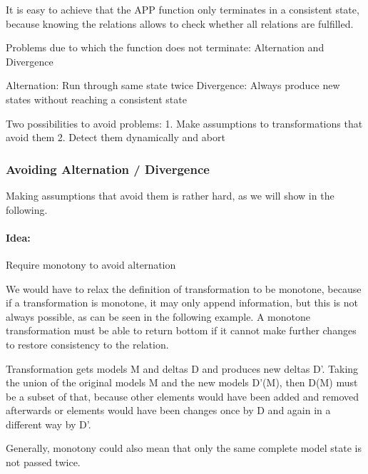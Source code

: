 It is easy to achieve that the APP function only terminates in a consistent state, because knowing the relations allows to check whether all relations are fulfilled. 

Problems due to which the function does not terminate: Alternation and Divergence

Alternation: Run through same state twice
Divergence: Always produce new states without reaching a consistent state

Two possibilities to avoid problems:
1. Make assumptions to transformations that avoid them
2. Detect them dynamically and abort


\subsubsection{Avoiding Alternation / Divergence}

Making assumptions that avoid them is rather hard, as we will show in the following.

\paragraph{Idea:} Require monotony to avoid alternation

We would have to relax the definition of transformation to be monotone, because if a transformation is monotone, it may only append information, but this is not always possible, as can be seen in the following example. A monotone transformation must be able to return bottom if it cannot make further changes to restore consistency to the relation.

\begin{definition}
    Transformation gets models M and deltas D and produces new deltas D'. Taking the union of the original models M and the new models D'(M), then D(M) must be a subset of that, because other elements would have been added and removed afterwards or elements would have been changes once by D and again in a different way by D'.

    Generally, monotony could also mean that only the same complete model state is not passed twice. 
\end{definition}

